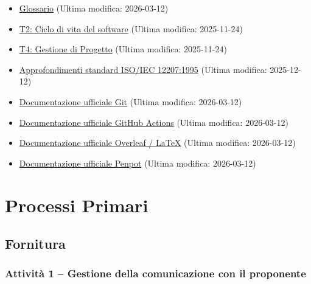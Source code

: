 \documentclass[a4paper, 11pt, oneside]{scrartcl}
\begin{document}
\begin{itemize}
    \item \href{URL_GLOSSARIO}{Glossario} (Ultima modifica: 2026-03-12)
    \item \href{https://www.math.unipd.it/~tullio/IS-1/2025/Dispense/T2.pdf}{T2: Ciclo di vita del software} (Ultima modifica: 2025-11-24)
    \item \href{https://www.math.unipd.it/~tullio/IS-1/2025/Dispense/T4.pdf}{T4: Gestione di Progetto} (Ultima modifica: 2025-11-24)
    \item \href{https://www.math.unipd.it/~rcardin/swea/2021/Lezione-ArchiSW-1.pdf}{Approfondimenti standard ISO/IEC 12207:1995} (Ultima modifica: 2025-12-12)
    \item \href{https://git-scm.com/doc}{Documentazione ufficiale Git} (Ultima modifica: 2026-03-12)
    \item \href{https://docs.github.com/en/actions}{Documentazione ufficiale GitHub Actions} (Ultima modifica: 2026-03-12)
    \item \href{https://www.overleaf.com/learn}{Documentazione ufficiale Overleaf / \LaTeX{}} (Ultima modifica: 2026-03-12)
    \item \href{https://help.penpot.app}{Documentazione ufficiale Penpot} (Ultima modifica: 2026-03-12)
\end{itemize}

\newpage
\section{Processi Primari}

\subsection{Fornitura}

\subsubsection{Attività 1 – Gestione della comunicazione con il proponente}
\end{document}
